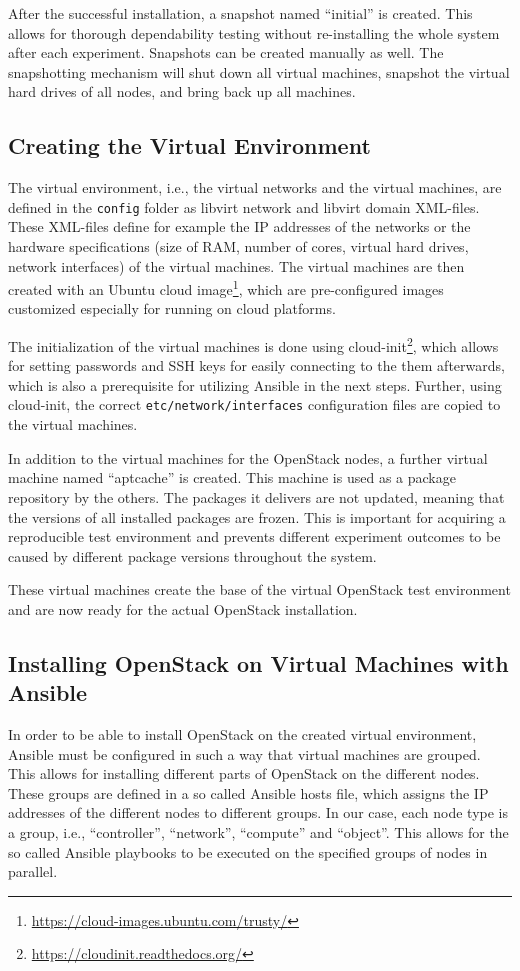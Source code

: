 After the successful installation, a snapshot named ``initial'' is created. This allows for thorough dependability testing without re-installing the whole system after each experiment. Snapshots can be created manually as well. The snapshotting mechanism will shut down all virtual machines, snapshot the virtual hard drives of all nodes, and bring back up all machines.

\subsection{Creating the Virtual Environment}
\label{subsec:createve}
The virtual environment, i.e., the virtual networks and the virtual machines, are defined in the \verb|config| folder as libvirt network and libvirt domain XML-files. These XML-files define for example the IP addresses of the networks or the hardware specifications (size of RAM, number of cores, virtual hard drives, network interfaces) of the virtual machines. The virtual machines are then created with an Ubuntu cloud image\footnote{\url{https://cloud-images.ubuntu.com/trusty/}}, which are pre-configured images customized especially for running on cloud platforms. 

The initialization of the virtual machines is done using cloud-init\footnote{\url{https://cloudinit.readthedocs.org/}}, which allows for setting passwords and SSH keys for easily connecting to the them afterwards, which is also a prerequisite for utilizing Ansible in the next steps. Further, using cloud-init, the correct \verb|etc/network/interfaces| configuration files are copied to the virtual machines. 

In addition to the virtual machines for the OpenStack nodes, a further virtual machine named ``aptcache'' is created. This machine is used as a package repository by the others. The packages it delivers are not updated, meaning that the versions of all installed packages are frozen. This is important for acquiring a reproducible test environment and prevents different experiment outcomes to be caused by different package versions throughout the system.

These virtual machines create the base of the virtual OpenStack test environment and are now ready for the actual OpenStack installation.

\subsection{Installing OpenStack on Virtual Machines with Ansible}
In order to be able to install OpenStack on the created virtual environment, Ansible must be configured in such a way that virtual machines are grouped. This allows for installing different parts of OpenStack on the different nodes. These groups are defined in a so called Ansible hosts file, which assigns the IP addresses of the different nodes to different groups. In our case, each node type is a group, i.e., ``controller'', ``network'', ``compute'' and ``object''. This allows for the so called Ansible playbooks to be executed on the specified groups of nodes in parallel. 


